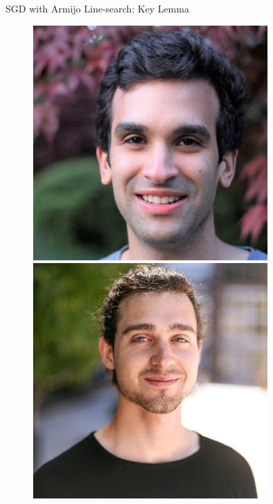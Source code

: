 \documentclass[mathserif,notheorems, hyperref={colorlinks, citecolor=blue, urlcolor=blue, linkcolor=blue}]{beamer}
\begin{document}
\begin{frame}{SGD with Armijo Line-search: Key Lemma}
\begin{minipage}[t]{0.15\textwidth}
\begin{figure}[t]
                \vspace{0.4ex}
                \includegraphics[width=0.8\textwidth]{collaborators/issam}

                \vspace{0.4ex}
                \includegraphics[width=0.8\textwidth]{collaborators/gauthier}


\end{figure}
\end{minipage}
\end{frame}
\end{document}
